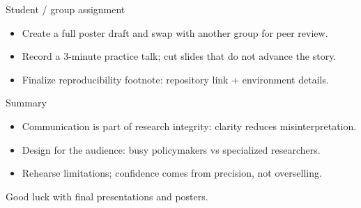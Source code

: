 \documentclass[aspectratio=169,11pt]{beamer}
\begin{document}
\begin{frame}{Student / group assignment}
  \begin{itemize}
    \item Create a full poster draft and swap with another group for peer review.
    \item Record a 3-minute practice talk; cut slides that do not advance the story.
    \item Finalize reproducibility footnote: repository link + environment details.
  \end{itemize}
\end{frame}

\begin{frame}{Summary}
  \begin{itemize}
    \item Communication is part of research integrity: clarity reduces misinterpretation.
    \item Design for the audience: busy policymakers vs specialized researchers.
    \item Rehearse limitations; confidence comes from precision, not overselling.
  \end{itemize}
\end{frame}

\begin{frame}[plain]
  \begin{center}
    \Large Good luck with final presentations and posters.
  \end{center}
\end{frame}
\end{document}
